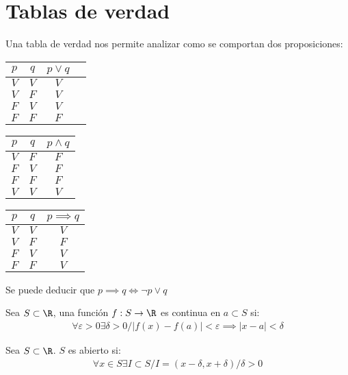 \documentclass{../Topologia.tex}
\begin{document}
\section{Tablas de verdad}
Una tabla de verdad nos permite analizar como se comportan dos proposiciones:
\begin{table}[h]
	\centering

	\begin{tabular}{c|c|c|c}
		$p$ & $q$ & $p\vee q$\\
		\hline
		$V$ & $V$ & $V$\\
		$V$ & $F$ & $V$\\
		$F$ & $V$ & $V$\\
		$F$ & $F$ & $F$\\  
	\end{tabular}
\end{table}
\begin{table}[h]
	\centering

	\begin{tabular}{c|c|c}
		$p$ & $q$ & $p\wedge q$\\
		\hline
		$V$ & $F$ &$F$\\
		$F$&$V$&$F$\\
		$F$ & $F$ & $F$\\
		$V$ & $V$ & $V$
	\end{tabular}
\end{table}
\begin{table}[h]
	\centering

	\begin{tabular}{c|c|c}
		$p$ & $q$ & $p \implies q$\\
		\hline
		$V$ & $V$ & $V$\\
		$V$&$F$&$F$\\
		$F$&$V$&$V$\\
		$F$&$F$&$V$
		
	\end{tabular}
\end{table}
Se puede deducir que $p \implies q \iff \neg p \vee q$
\begin{defin}
	Sea $S\subset \R$, una función $f:S\to \R$ es continua en $a\subset S$ si:
	\begin{equation}
		\begin{split}
			\forall \varepsilon > 0 \exists \delta > 0 /
			|f(x)-f(a)|<\varepsilon \implies |x-a| < \delta
		\end{split}
	\end{equation}
\end{defin}
\begin{defin}
	Sea $S \subset \R$. $S$ es abierto si:
	\begin{equation}
		\begin{split}
			\forall x \in S \exists I \subset S / I =
			(x-\delta, x+\delta) / \delta > 0
		\end{split}
	\end{equation}
\end{defin}
\end{document}
